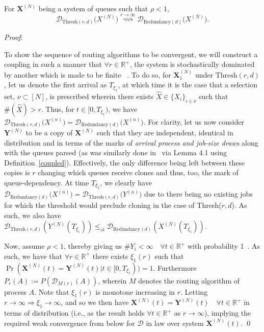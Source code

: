 \begin{lemma}
    \label{sup}
    For $\mathbf{X}^{(N)}$ being a system of queues such that $\rho < 1$,
    \normalfont \[\mathcal{D}_{\text{Thresh}(r,d)}\mathbf(X^{(N)}) \overset{r \rightarrow \infty}{\rightsquigarrow} \mathcal{D}_{\text{Redundancy}(d)}\mathbf(X^{(N)}).\]
\end{lemma}
\textit{Proof}:

To show the sequence of routing algorithms to be convergent, we will construct a coupling in such a manner that $\forall r \in \mathbb{R}^{+}$, the system is stochastically dominated by another which is made to be finite~\cite{baccelli_elements_2003} .
To do so, for $\mathbf{X}_{1}^{(N)}$ under $\text{Thresh}(r,d)$, let us denote the first arrival as $T_{\xi_{1}}$, at which time it is the case that a selection set, $\nu \subset [N] $, is prescribed wherein there exists $\hat X \in \{X_{i}\}_{i \in \nu} $ such that $ \# (\hat X) > r $.
Thus, for  $ t \in [0,T_{\xi_{1}})$, we have $\mathcal{D}_{\text{Thresh}\mathit{(r,d)}}\mathbf(X^{(n)}) = \mathcal{D}_{\text{Redundancy}\mathit{(d)}}\mathbf(X^{(n)})$.
For clarity, let us now consider $\mathbf{Y}^{(N)}$ to be a copy of  $\mathbf{X}^{(N)}$ such that they are independent, identical in distribution and in terms of the marks of \textit{arrival process and job-size draws} along with the queues parsed (as was similarly done in~\cite{bramson_asymptotic_2012} via Lemma 4.1 using Definition~\ref{coupled}).
Effectively, the only difference being left between these copies is $r$ changing which queues receive clones and thus, too, the mark of queue-dependency.
At time $T_{\xi_{1}}$, we clearly have $\mathcal{D}_{\text{Redundancy}\mathit{(d)}}\mathbf(X^{(n)}) = \mathcal{D}_{\text{Thresh}\mathit{(r,d)}}\mathbf(Y^{(n)})$ due to there being no existing jobs for which the threshold would preclude cloning in the case of Thresh($r,d$).
As such, we also have $\mathcal{D}_{\text{Thresh}(r,d)}(Y^{(N)}(T_{\xi_{1}}))\leq_{st}\mathcal{D}_{\text{Redundancy}(d)}(X^{(N)}(T_{\xi_{1}}))$.

Now, assume $\rho < 1$, thereby giving us $ \# Y_{i}  < \infty \quad \forall t \in \mathbb{R}^{+}$ with probability 1~\cite{gardner_redundancy-d_2017}.
As such, we have that $\forall r \in \mathbb{R}^{+}$ there exists $ \xi_{1}(r) $ such that $ \Pr(\mathbf{X}^{(N)} (t) = \mathbf{Y}^{(N)}(t) |t \in [0,T_{\xi_{1}})) = 1$.
Furthermore $P_{r}(A) := P(\mathcal{D}_{M(r)}(A))$, wherein $M$ denotes the routing algorithm of process $A$.
Note that $\xi_{1} (r)$ is monotone increasing in $r$.
Letting $r \rightarrow \infty \Rightarrow \xi_{1} \rightarrow \infty$, and so we then have $\mathbf{X}^{(N)}(t) =  \mathbf{Y}^{(N)}(t) \quad \forall t \in \mathbb{R}^{+}$ in terms of distribution (i.e., as the result holds $\forall t \in \mathbb{R}^{+}$ as $r\rightarrow \infty$), implying the required weak convergence from below for $\mathcal{D}$ in law over system  $\mathbf{X}^{(N)}(t)$.  \qed

